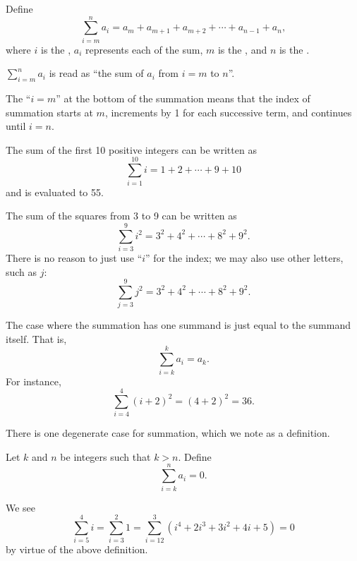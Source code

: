 \begin{definition}
    Define
    \[
        \sum_{i=m}^{n}a_i = a_m + a_{m+1} + a_{m+2} + \cdots + a_{n-1} + a_n,
    \]
    where $i$ is the , $a_i$ represents each  of the sum, $m$ is the , and $n$ is the .
\end{definition}
\begin{remark}
    $\displaystyle \sum_{i=m}^{n}a_i$ is read as ``the sum of $a_i$ from $i=m$ to $n$''.
\end{remark}
\begin{remark}
    The ``$i = m$'' at the bottom of the summation means that the index of summation starts at $m$, increments by 1 for each successive term, and continues until $i = n$.
\end{remark}

\begin{example}
    The sum of the first 10 positive integers can be written as
    \[
        \sum_{i=1}^{10}i = 1 + 2 + \cdots + 9 + 10
    \]
    and is evaluated to 55.
\end{example}

\begin{example}
    The sum of the squares from 3 to 9 can be written as
    \[
        \sum_{i=3}^{9}i^2 = 3^2 + 4^2 + \cdots + 8^2 + 9^2.
    \]
    There is no reason to just use ``$i$'' for the index; we may also use other letters, such as $j$:
    \[
        \sum_{j=3}^{9}j^2 = 3^2 + 4^2 + \cdots + 8^2 + 9^2.
    \]
\end{example}

\begin{example}
    The case where the summation has one summand is just equal to the summand itself. That is,
    \[
        \sum_{i=k}^{k}a_i = a_k.
    \]
    For instance,
    \[
        \sum_{i=4}^4(i+2)^2 = (4+2)^2 = 36.
    \]
\end{example}

There is one degenerate case for summation, which we note as a definition.

\begin{definition}
    Let $k$ and $n$ be integers such that $k > n$. Define
    \[
        \sum_{i=k}^{n}a_i = 0.
    \]
\end{definition}

\begin{example}
    We see
    \[
        \sum_{i=5}^{4}i = \sum_{i=3}^{2}1 = \sum_{i=12}^{3}(i^4 + 2i^3 + 3i^2 + 4i + 5) = 0
    \]
    by virtue of the above definition.
\end{example}

